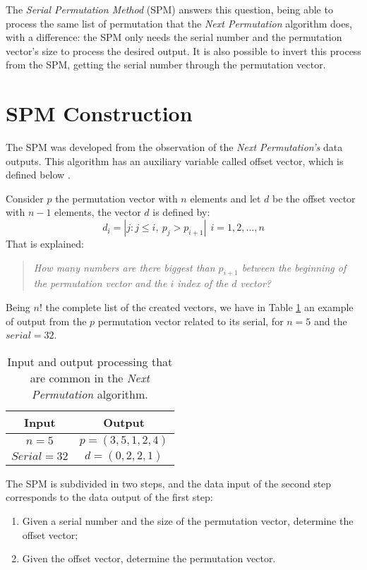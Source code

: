 \documentclass {amsart}
\begin{document}
The \emph{Serial Permutation Method} (SPM) answers this question,
being able to process the same list of permutation that the
\emph{Next Permutation} algorithm does, with a difference: the SPM
only needs the serial number and the permutation vector's size to
process the desired output. It is also possible to invert this
process from the SPM, getting the serial number through the
permutation vector.
\section*{SPM Construction}
The SPM was developed from the observation of the \emph{Next
Permutation's} data outputs. This algorithm has an auxiliary
variable called offset vector, which is defined below \cite{wi}.

Consider {$p$} the permutation vector with {$n$} elements and let
{$d$} be the offset vector with {$n - 1$} elements, the vector
{$d$} is defined by:
\begin{equation} \label{eq}
    d_i = |j: j \leq i, ~p_j > p_{i+1}| ~~i = 1, 2, ... ,n
\end{equation}
That is explained:
\begin{quote}
\emph{How many numbers are there biggest than {$p_{i+1}$} between
the beginning of the permutation vector and the {$i$} index of the
{$d$} vector?}
\end{quote}

Being {$n!$} the complete list of the created vectors, we have in
Table \ref{tab_1} an example of output from the {$p$} permutation
vector related to its serial, for {$n = 5$} and the {$serial =
32$}.
\begin{table}[!hbp]
  \centering
  \caption{Input and output processing that are common in the \emph{Next Permutation} algorithm.}
  \label{tab_1}
\begin{tabular}{c|c}
 \hline
  Input & Output \\
  \hline
  {$n = 5$} & {$p = (3, 5, 1, 2, 4)$} \\
  {$Serial = 32$} & {$d = (0, 2, 2, 1)$} \\
  \hline
 \end{tabular}
\end{table}

The SPM is subdivided in two steps, and the data input of the
second step corresponds to the data output of the first step:
\begin{enumerate}
\item  Given a serial number and the size of the permutation
vector, determine the offset vector;
\item Given the offset vector,
determine the permutation vector.
\end{enumerate}
\end{document}
